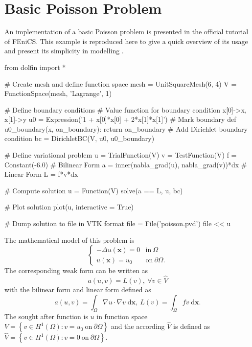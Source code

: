 \documentclass[10pt,a4paper]{scrreprt}
\newcommand{\myd}{\;\mathrm{d}}
\begin{document}
\section{Basic Poisson Problem}
An implementation of a basic Poisson problem is presented in the official tutorial of FEniCS. This example is reproduced here to give a quick overview of its usage and present its simplicity in modelling \citep{wells2012automated}.

\begin{python}
from dolfin import *

# Create mesh and define function space
mesh = UnitSquareMesh(6, 4)
V = FunctionSpace(mesh, 'Lagrange', 1)

# Define boundary conditions
# Value function for boundary condition x[0]->x, x[1]->y
u0 = Expression('1 + x[0]*x[0] + 2*x[1]*x[1]')
# Mark boundary
def u0_boundary(x, on_boundary):
    return on_boundary
# Add Dirichlet boundary condition
bc = DirichletBC(V, u0, u0_boundary)

# Define variational problem
u = TrialFunction(V)
v = TestFunction(V)
f = Constant(-6.0)
# Bilinear Form
a = inner(nabla_grad(u), nabla_grad(v))*dx
# Linear Form
L = f*v*dx

# Compute solution
u = Function(V)
solve(a == L, u, bc)

# Plot solution
plot(u, interactive = True)

# Dump solution to file in VTK format
file = File('poisson.pvd')
file << u
\end{python}

The mathematical model of this problem is 
\begin{equation}
\label{eq: poisson}
\left\{
\begin{array}{ll}
-\Delta u(\mathbf{x})=0 & \text{in} \ \Omega \\
u(\mathbf{x})=u_{0} & \text{on} \ \partial \Omega .
\end{array}
\right.
\end{equation}
The corresponding weak form can be written as
\begin{equation}
\label{eq: weak}
a(u,v) = L(v), \ \forall v \in \hat{V}
\end{equation}
with the bilinear form and linear form defined as
\[
a(u,v) = \int_{\Omega} \nabla{u} \cdot \nabla{v} \myd{\mathbf{x}}, \ L(v) = \int_{\Omega} fv \myd{\mathbf{x}}.
\]
The sought after function is $u$ in function space $V = \left\lbrace v \in H^{1}\left( \Omega \right) : v=u_{0} \  \text{on} \ \partial \Omega \right\rbrace$ and the according $\hat{V}$ is defined as $\hat{V} = \left\lbrace v \in H^{1}\left( \Omega \right) : v=0 \  \text{on} \ \partial \Omega \right\rbrace$. 
\end{document}
